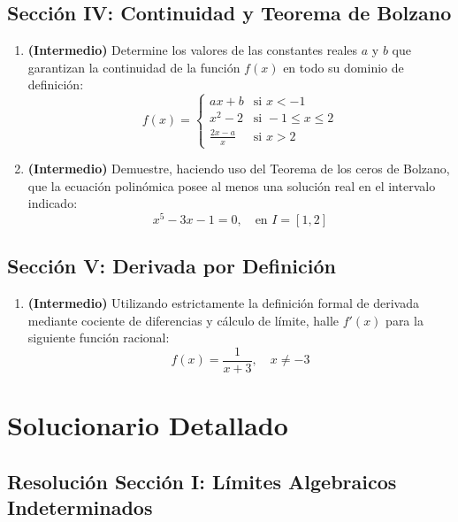 \documentclass[11pt,letterpaper]{article}
\begin{document}
\subsection{Sección IV: Continuidad y Teorema de Bolzano}
\begin{enumerate}[label=\textbf{\arabic*.}, resume]
    \item \textbf{(Intermedio)} Determine los valores de las constantes reales $a$ y $b$ que garantizan la continuidad de la función $f(x)$ en todo su dominio de definición:
    $$f(x) = \begin{cases} 
        ax + b & \text{si } x < -1 \\ 
        x^2 - 2 & \text{si } -1 \leq x \leq 2 \\ 
        \frac{2x - a}{x} & \text{si } x > 2 
    \end{cases}$$
    
    \item \textbf{(Intermedio)} Demuestre, haciendo uso del Teorema de los ceros de Bolzano, que la ecuación polinómica posee al menos una solución real en el intervalo indicado:
    $$x^5 - 3x - 1 = 0, \quad \text{en } I = [1, 2]$$
\end{enumerate}

\subsection{Sección V: Derivada por Definición}
\begin{enumerate}[label=\textbf{\arabic*.}, resume]
    \item \textbf{(Intermedio)} Utilizando estrictamente la definición formal de derivada mediante cociente de diferencias y cálculo de límite, halle $f'(x)$ para la siguiente función racional:
    $$f(x) = \frac{1}{x+3}, \quad x \neq -3$$
\end{enumerate}

\newpage

\section{Solucionario Detallado}

\subsection{Resolución Sección I: Límites Algebraicos Indeterminados}
\end{document}
